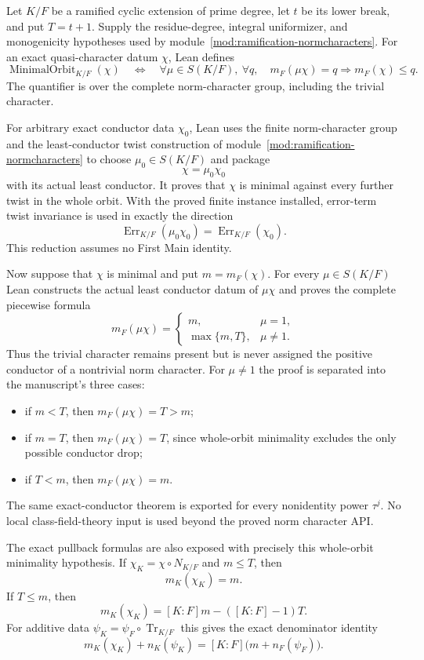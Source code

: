 \begin{lemma}
\label{mod:parameters-minimalorbitstationary}
Let $K/F$ be a ramified cyclic extension of prime degree, let $t$ be its
lower break, and put $T=t+1$.  Supply the residue-degree, integral
uniformizer, and monogenicity hypotheses used by
module~\ref{mod:ramification-normcharacters}.  For an exact
quasi-character datum $\chi$, Lean defines
\[
 \operatorname{MinimalOrbit}_{K/F}(\chi)
 \quad\Longleftrightarrow\quad
 \forall\mu\in S(K/F),\ \forall q,\quad
 m_F(\mu\chi)=q\Longrightarrow m_F(\chi)\le q.
\]
The quantifier is over the complete norm-character group, including the
trivial character.

For arbitrary exact conductor data $\chi_0$, Lean uses the finite
norm-character group and the least-conductor twist construction of
module~\ref{mod:ramification-normcharacters} to choose
$\mu_0\in S(K/F)$ and package
\[
 \chi=\mu_0\chi_0
\]
with its actual least conductor.  It proves that $\chi$ is minimal against
every further twist in the whole orbit.  With the proved finite instance
installed, error-term twist invariance is used in exactly the direction
\[
 \operatorname{Err}_{K/F}(\mu_0\chi_0)
 =\operatorname{Err}_{K/F}(\chi_0).
\]
This reduction assumes no First Main identity.

Now suppose that $\chi$ is minimal and put $m=m_F(\chi)$.  For every
$\mu\in S(K/F)$ Lean constructs the actual least conductor datum of
$\mu\chi$ and proves the complete piecewise formula
\[
 m_F(\mu\chi)=
 \begin{cases}
 m,&\mu=1,\\
 \max\{m,T\},&\mu\ne1.
 \end{cases}
\]
Thus the trivial character remains present but is never assigned the
positive conductor of a nontrivial norm character.  For $\mu\ne1$ the proof
is separated into the manuscript's three cases:
\begin{itemize}
\item if $m<T$, then $m_F(\mu\chi)=T>m$;
\item if $m=T$, then $m_F(\mu\chi)=T$, since whole-orbit minimality excludes
  the only possible conductor drop;
\item if $T<m$, then $m_F(\mu\chi)=m$.
\end{itemize}
The same exact-conductor theorem is exported for every nonidentity power
$\tau^j$.  No local class-field-theory input is used beyond the proved norm
character API.

The exact pullback formulas are also exposed with precisely this
whole-orbit minimality hypothesis.  If $\chi_K=\chi\circ N_{K/F}$ and
$m\le T$, then
\[
 m_K(\chi_K)=m.
\]
If $T\le m$, then
\[
 m_K(\chi_K)
 =[K:F]m-([K:F]-1)T.
\]
For additive data $\psi_K=\psi_F\circ\operatorname{Tr}_{K/F}$ this gives
the exact denominator identity
\[
 m_K(\chi_K)+n_K(\psi_K)
 =[K:F]\bigl(m+n_F(\psi_F)\bigr).
\]


\end{lemma}
